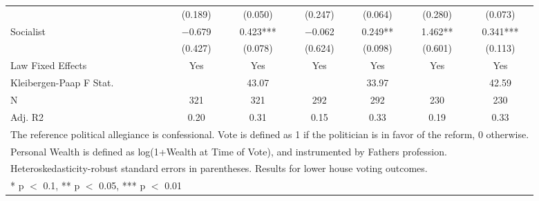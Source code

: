 \begin{table}
\begin{tabular}[t]{lcccccc}
 & (\num{0.189}) & (\num{0.050}) & (\num{0.247}) & (\num{0.064}) & (\num{0.280}) & (\num{0.073})\\
Socialist & \num{-0.679} & \num{0.423}*** & \num{-0.062} & \num{0.249}** & \num{1.462}** & \num{0.341}***\\
 & (\num{0.427}) & (\num{0.078}) & (\num{0.624}) & (\num{0.098}) & (\num{0.601}) & (\num{0.113})\\
\midrule
Law Fixed Effects & Yes & Yes & Yes & Yes & Yes & Yes\\
Kleibergen-Paap F Stat. &  & 43.07 &  & 33.97 &  & 42.59\\
N & \num{321} & \num{321} & \num{292} & \num{292} & \num{230} & \num{230}\\
Adj. R2 & \num{0.20} & \num{0.31} & \num{0.15} & \num{0.33} & \num{0.19} & \num{0.33}\\
\bottomrule
\multicolumn{7}{l}{\rule{0pt}{1em}The reference political allegiance is confessional. Vote is defined as 1 if the politician is in favor of the reform, 0 otherwise.}\\
\multicolumn{7}{l}{\rule{0pt}{1em}Personal Wealth is defined as log(1+Wealth at Time of Vote), and instrumented by Fathers profession.}\\
\multicolumn{7}{l}{\rule{0pt}{1em}Heteroskedasticity-robust standard errors in parentheses. Results for lower house voting outcomes.}\\
\multicolumn{7}{l}{\rule{0pt}{1em}* p $<$ 0.1, ** p $<$ 0.05, *** p $<$ 0.01}\\
\end{tabular}
\end{table}
